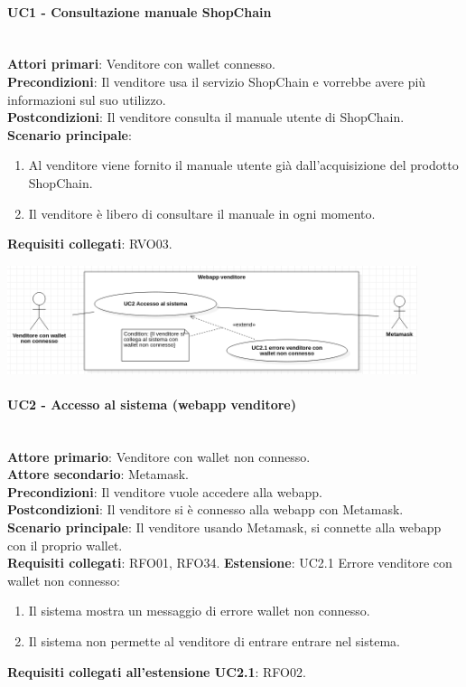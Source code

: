 \documentclass[a4paper, 12pt]{article}
\begin{document}
\paragraph{UC1 - Consultazione manuale ShopChain}\\
\textbf{Attori primari}: Venditore con wallet connesso.\\
\textbf{Precondizioni}: Il venditore usa il servizio ShopChain e vorrebbe avere più informazioni sul suo utilizzo.\\
\textbf{Postcondizioni}: Il venditore consulta il manuale utente di ShopChain.\\
\textbf{Scenario principale}:
\begin{enumerate}
\item Al venditore viene fornito il manuale utente già dall'acquisizione del prodotto ShopChain.
\item Il venditore è libero di consultare il manuale in ogni momento.
\end{enumerate}
\textbf{Requisiti collegati}: RVO03.

\includegraphics[width=0.9\textwidth]{UC_WAV2}

\paragraph{UC2 - Accesso al sistema (webapp venditore)}\\
\textbf{Attore primario}: Venditore con wallet non connesso.\\
\textbf{Attore secondario}: Metamask.\\
\textbf{Precondizioni}: Il venditore vuole accedere alla webapp.\\
\textbf{Postcondizioni}: Il venditore si è connesso alla webapp con Metamask.\\
\textbf{Scenario principale}:
Il venditore usando Metamask, si connette alla webapp con il proprio wallet.\\
\textbf{Requisiti collegati}: RFO01, RFO34.
\textbf{Estensione}:
UC2.1 Errore venditore con wallet non connesso:
\begin{enumerate}
    \item Il sistema mostra un messaggio di errore wallet non connesso.
    \item Il sistema non permette al venditore di entrare entrare nel sistema.
\end{enumerate}
\textbf{Requisiti collegati all'estensione UC2.1}: RFO02.
\end{document}
